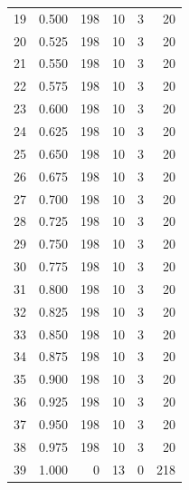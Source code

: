 \documentclass[a4paper,twoside,12pt]{book}
\begin{document}
\begin{appendices}
\begin{table}
\begin{tabular}{lrrrrr}
		19 &  0.500 &       198 &        10 &               3 &              20 \\
		20 &  0.525 &       198 &        10 &               3 &              20 \\
		21 &  0.550 &       198 &        10 &               3 &              20 \\
		22 &  0.575 &       198 &        10 &               3 &              20 \\
		23 &  0.600 &       198 &        10 &               3 &              20 \\
		24 &  0.625 &       198 &        10 &               3 &              20 \\
		25 &  0.650 &       198 &        10 &               3 &              20 \\
		26 &  0.675 &       198 &        10 &               3 &              20 \\
		27 &  0.700 &       198 &        10 &               3 &              20 \\
		28 &  0.725 &       198 &        10 &               3 &              20 \\
		29 &  0.750 &       198 &        10 &               3 &              20 \\
		30 &  0.775 &       198 &        10 &               3 &              20 \\
		31 &  0.800 &       198 &        10 &               3 &              20 \\
		32 &  0.825 &       198 &        10 &               3 &              20 \\
		33 &  0.850 &       198 &        10 &               3 &              20 \\
		34 &  0.875 &       198 &        10 &               3 &              20 \\
		35 &  0.900 &       198 &        10 &               3 &              20 \\
		36 &  0.925 &       198 &        10 &               3 &              20 \\
		37 &  0.950 &       198 &        10 &               3 &              20 \\
		38 &  0.975 &       198 &        10 &               3 &              20 \\
		39 &  1.000 &         0 &        13 &               0 &             218 \\
		\bottomrule
	\end{tabular}						
\end{table}


\end{appendices}
\end{document}
